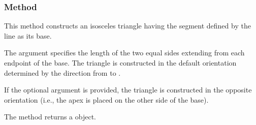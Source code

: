 \vspace{1em}
\begin{minipage}{.5\textwidth}
  \begin{center}
  \end{center}
\end{minipage}
\begin{minipage}{.5\textwidth}
\begin{tkzexample}
\end{tkzexample}
\end{minipage}

\subsubsection{Method }
\label{ssub:method_line_isosceles}

This method constructs an isosceles triangle having the segment defined by the line as its base.

\medskip
\noindent
The argument  specifies the length of the two equal sides extending from each endpoint of the base. The triangle is constructed in the default orientation determined by the direction from  to .

\medskip
\noindent
If the optional argument  is provided, the triangle is constructed in the opposite orientation (i.e., the apex is placed on the other side of the base).

\medskip
\noindent
The method returns a  object.

